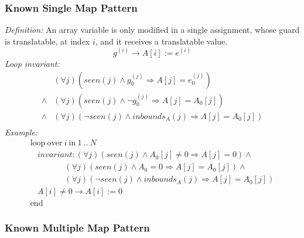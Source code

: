 \documentclass[a4paper,10pt]{article}
\newcommand{\idx}{\ensuremath{i}\xspace}
\newcommand{\at}[1]{{(#1)}}
\newcommand{\KWloop}{\ensuremath{\mathrm{loop}~}}
\newcommand{\KWend}{\ensuremath{\mathrm{end}~}}
\newcommand{\KWover}{\ensuremath{\mathrm{over}~}}
\newcommand{\KWin}{\ensuremath{~\mathrm{in}~}}
\newcommand{\impl}{\ensuremath{\Longrightarrow}}
\newcommand{\inbounds}[2]{\ensuremath{\mathit{inbounds}_{#1}(#2)}\xspace}
\newcommand{\seen}[1]{\ensuremath{\mathit{seen}(#1)}\xspace}
\newcommand{\loopinvariant}{\noindent\textit{Loop invariant:}\xspace}
\newcommand{\patterndef}{\noindent\textit{Definition:}\xspace}
\newcommand{\patternexample}{\noindent\textit{Example:}\xspace}
\begin{document}
\subsubsection*{Known Single Map Pattern}

\patterndef An array variable is only modified in a single assignment, whose
guard is translatable, at index \idx, and it receives a translatable value.
%
$$g^\at{\idx} \rightarrow A[\idx] := e^\at{\idx}$$
%
\loopinvariant
%
\begin{eqnarray*}
&(\forall j)(\seen{j} \land g_0^\at{j} \impl A[j] = e_0^\at{j}) \\
\land&(\forall j)(\seen{j} \land \neg g_0^\at{j} \impl A[j] = A_0[j]) \\
\land&
 (\forall j)(\neg \seen{j} \land \inbounds{A}{j} \impl A[j] = A_0[j])\\
\end{eqnarray*}
%
\patternexample
$$\begin{array}{l}
  \KWloop \KWover i \KWin 1~..~N \\
  ~~~~ \textit{invariant}: (\forall j)(\seen{j} \land A_0[j] \neq 0 \impl A[j] = 0) \land\\
  ~~~~~~~~~~~~~~~~~~~ (\forall j)(\seen{j} \land A_0 = 0 \impl A[j] = A_0[j]) \land\\
  ~~~~~~~~~~~~~~~~~~~ (\forall j)(\neg \seen{j} \land \inbounds{A}{j} \impl A[j] = A_0[j])\\
  ~~~~ A[i] \neq 0 \rightarrow A[i] := 0\\
  \KWend
\end{array}$$

\subsubsection*{Known Multiple Map Pattern}
\end{document}
